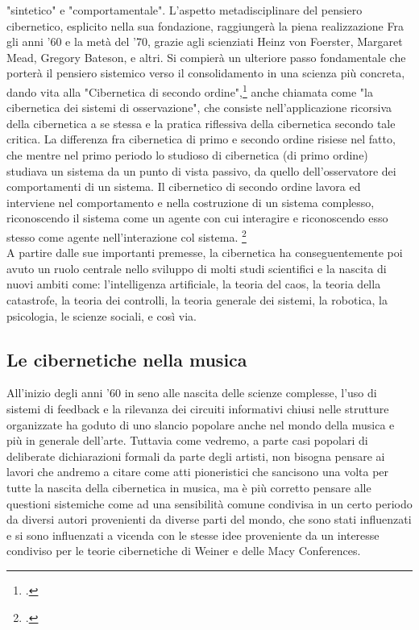 "sintetico" e "comportamentale".
L'aspetto metadisciplinare del pensiero cibernetico,
esplicito nella sua fondazione, raggiungerà la piena realizzazione
Fra gli anni '60 e la metà del '70, grazie agli scienziati
Heinz von Foerster, Margaret Mead, Gregory Bateson, e altri.
Si compierà un ulteriore passo fondamentale che porterà
il pensiero sistemico verso il consolidamento in una scienza più concreta,
dando vita alla "Cibernetica di secondo ordine",\footcite{wikisecondordercyb}
anche chiamata come "la cibernetica dei sistemi di osservazione",
che consiste nell'applicazione
ricorsiva della cibernetica a se stessa e la pratica riflessiva della cibernetica
secondo tale critica.
La differenza fra cibernetica di primo e secondo ordine risiese nel fatto,
che mentre nel primo periodo lo studioso di cibernetica (di primo ordine)
studiava un sistema da un punto di vista passivo, da quello dell'osservatore
dei comportamenti di un sistema.
Il  cibernetico di secondo ordine lavora ed interviene nel comportamento
e nella costruzione di un sistema complesso,
riconoscendo il sistema come un agente con cui interagire e
riconoscendo esso stesso come agente nell'interazione col sistema.
\footcite{scottsecondordercyb}
\\ A partire dalle sue importanti premesse,
la cibernetica ha conseguentemente poi avuto un ruolo centrale nello sviluppo di
molti studi scientifici e la nascita
di nuovi ambiti come: l'intelligenza artificiale, la teoria del caos,
la teoria della catastrofe,
la teoria dei controlli, la teoria generale dei sistemi, la robotica,
la psicologia, le scienze sociali, e così via.

\subsection{Le cibernetiche nella musica}
\label{sec:Le cibernetiche nella musica}
All'inizio degli anni '60 in seno alle nascita delle scienze complesse,
l'uso di sistemi di feedback e la rilevanza dei circuiti informativi chiusi
nelle strutture organizzate
ha goduto di uno slancio popolare anche nel mondo della musica
e più in generale dell'arte.
Tuttavia come vedremo, a parte casi popolari di deliberate dichiarazioni
formali da parte degli artisti, non bisogna pensare ai lavori che andremo a citare
come atti pioneristici che sancisono una volta per tutte la nascita della cibernetica in musica,
ma è più corretto pensare alle questioni sistemiche come ad una sensibilità
comune condivisa in un certo periodo da diversi autori provenienti da diverse parti del mondo,
che sono stati influenzati e si sono influenzati a vicenda
con le stesse idee proveniente da un interesse condiviso per
le teorie cibernetiche di Weiner e delle Macy Conferences.

